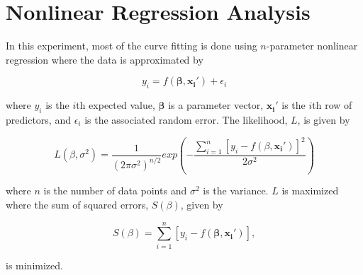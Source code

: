 
\section{Nonlinear Regression Analysis}\label{nonlinearregressionanalysis}
In this experiment, most of the curve fitting is done using $n$-parameter nonlinear regression where the data is approximated by \cite{bates}

\begin{equation}
\label{nonlinfit}
y_{i}=f(\mathbf{\beta},\mathbf{x_{i}'})+\epsilon_{i}
\end{equation}

where $y_{i}$ is the $i$th expected value, $\mathbf{\beta}$ is a parameter vector, $\mathbf{x_{i}'}$ is the $i$th row of predictors, and $\epsilon_{i}$ is the associated random error.  The likelihood, $L$, is given by \cite{bates}

\begin{equation}
\label{likelihood}
L(\beta,\sigma^{2})=\frac{1}{(2\pi\sigma^{2})^{n/2}}exp(-\frac{\sum_{i=1}^{n}[y_{i}-f(\beta,\mathbf{x_{i}'})]^{2}}{2\sigma^{2}})
\end{equation}

where $n$ is the number of data points and $\sigma^{2}$ is the variance. $L$ is maximized where the sum of squared errors, $S(\beta)$, given by \cite{bates}

\begin{equation}
\label{sse}
S(\beta) = \sum_{i=1}^{n}[y_{i}-f(\mathbf{\beta},\mathbf{x_{i}'})],
\end{equation}

is minimized.